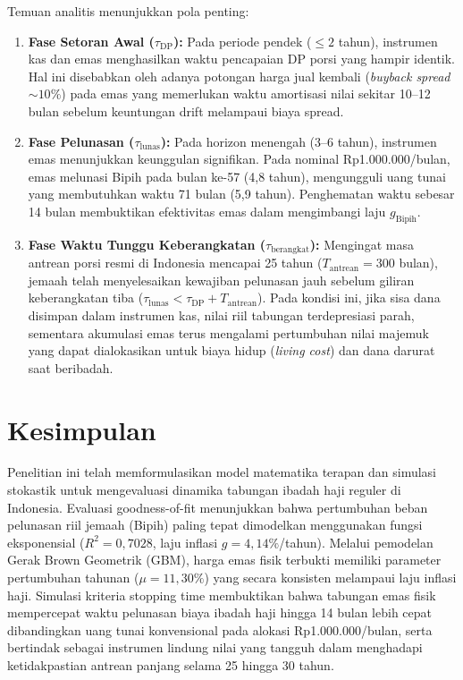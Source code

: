 \documentclass[journal,twoside]{IEEEtran}
\begin{document}
Temuan analitis menunjukkan pola penting:
\begin{enumerate}
    \item \textbf{Fase Setoran Awal ($\tau_{\text{DP}}$):} Pada periode pendek ($\le 2$ tahun), instrumen kas dan emas menghasilkan waktu pencapaian DP porsi yang hampir identik. Hal ini disebabkan oleh adanya potongan harga jual kembali (\textit{buyback spread} $\sim 10\%$) pada emas yang memerlukan waktu amortisasi nilai sekitar 10--12 bulan sebelum keuntungan drift melampaui biaya spread.
    \item \textbf{Fase Pelunasan ($\tau_{\text{lunas}}$):} Pada horizon menengah (3--6 tahun), instrumen emas menunjukkan keunggulan signifikan. Pada nominal Rp1.000.000/bulan, emas melunasi Bipih pada bulan ke-57 (4,8 tahun), mengungguli uang tunai yang membutuhkan waktu 71 bulan (5,9 tahun). Penghematan waktu sebesar 14 bulan membuktikan efektivitas emas dalam mengimbangi laju $g_{\text{Bipih}}$.
    \item \textbf{Fase Waktu Tunggu Keberangkatan ($\tau_{\text{berangkat}}$):} Mengingat masa antrean porsi resmi di Indonesia mencapai 25 tahun ($T_{\text{antrean}} = 300$ bulan), jemaah telah menyelesaikan kewajiban pelunasan jauh sebelum giliran keberangkatan tiba ($\tau_{\text{lunas}} < \tau_{\text{DP}} + T_{\text{antrean}}$). Pada kondisi ini, jika sisa dana disimpan dalam instrumen kas, nilai riil tabungan terdepresiasi parah, sementara akumulasi emas terus mengalami pertumbuhan nilai majemuk yang dapat dialokasikan untuk biaya hidup (\textit{living cost}) dan dana darurat saat beribadah.
\end{enumerate}

\section{Kesimpulan}
Penelitian ini telah memformulasikan model matematika terapan dan simulasi stokastik untuk mengevaluasi dinamika tabungan ibadah haji reguler di Indonesia. Evaluasi goodness-of-fit menunjukkan bahwa pertumbuhan beban pelunasan riil jemaah (Bipih) paling tepat dimodelkan menggunakan fungsi eksponensial ($R^2 = 0{,}7028$, laju inflasi $g = 4{,}14\%$/tahun). Melalui pemodelan Gerak Brown Geometrik (GBM), harga emas fisik terbukti memiliki parameter pertumbuhan tahunan ($\mu = 11{,}30\%$) yang secara konsisten melampaui laju inflasi haji. Simulasi kriteria stopping time membuktikan bahwa tabungan emas fisik mempercepat waktu pelunasan biaya ibadah haji hingga 14 bulan lebih cepat dibandingkan uang tunai konvensional pada alokasi Rp1.000.000/bulan, serta bertindak sebagai instrumen lindung nilai yang tangguh dalam menghadapi ketidakpastian antrean panjang selama 25 hingga 30 tahun.



\end{document}
